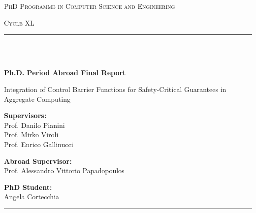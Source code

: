 \documentclass[12pt]{article}
\begin{document}
\begin{titlepage}
    \centering
    \vspace*{2cm}

    {\scshape\large PhD Programme in Computer Science and Engineering \par}
    \vspace{0.5cm}
    {\scshape\large Cycle XL \par}
    \vspace{0.5cm}

    \rule{\linewidth}{0.4mm} \\ [0.1mm]
    \raisebox{0.2cm}{\rule{\linewidth}{0.8mm}} \\[0.8cm]
    {\large\bfseries Ph.D. Period Abroad Final Report \par}
    \vspace{0.8cm}
    {\LARGE Integration of Control Barrier Functions for Safety-Critical Guarantees in Aggregate Computing\par}

    \vspace{1.5cm}

    \noindent
    \begin{minipage}[t]{0.3\textwidth}
        \raggedright
        \textbf{Supervisors:}\\[0.5cm]
        Prof. Danilo Pianini\\
        Prof. Mirko Viroli\\
        Prof. Enrico Gallinucci
    \end{minipage}%
    \hfill
    \begin{minipage}[t]{0.3\textwidth}
        \centering
        \textbf{Abroad Supervisor:}\\[0.5cm]
        Prof. Alessandro Vittorio Papadopoulos\\
    \end{minipage}
    \begin{minipage}[t]{0.3\textwidth}
        \raggedleft
        \textbf{PhD Student:}\\[0.5cm]
        Angela Cortecchia
    \end{minipage}

    \vspace{1.5cm}

    \rule{\linewidth}{0.8mm} \\ [0.1pt]
    \raisebox{0.2cm}{\rule{\linewidth}{0.4mm}} \\[1.5cm]

\end{titlepage}
\end{document}
